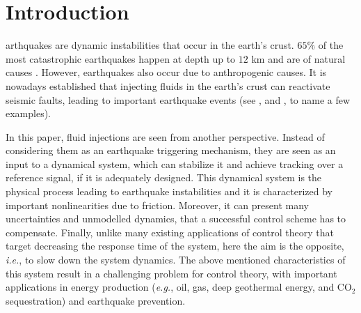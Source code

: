 \documentclass[journal,twoside,web]{ieeecolor}
\begin{document}
\section{Introduction}
\label{sec:Introduction}


arthquakes are dynamic instabilities that occur in the earth's crust. $65\%$ of the most catastrophic earthquakes happen at depth up to $12$ km and are of natural causes \cite{b:Scholz-2002}. However, earthquakes also occur due to anthropogenic causes. It is nowadays established that injecting fluids in the earth's crust can reactivate seismic faults, leading to important earthquake events (see \cite{b:Rubinstein-Mahani-2015}, \cite{b:Keranen-Savage-Abers-Cochran-2013} and \cite{b:Zastrow-2019}, to name a few examples).

In this paper, fluid injections are seen from another perspective. Instead of considering them as an earthquake triggering mechanism, they are seen as an input to a dynamical system, which can stabilize it and achieve tracking over a reference signal, if it is adequately designed. This dynamical system is the physical process leading to earthquake instabilities and it is characterized by important nonlinearities due to friction. Moreover, it can present many uncertainties and unmodelled dynamics, that a successful control scheme has to compensate. Finally, unlike many existing applications of control theory that target decreasing the response time of the system, here the aim is the opposite, \textit{i.e.}, to slow down the system dynamics. The above mentioned characteristics of this system result in a challenging problem for control theory, with important applications in energy production (\textit{e.g.}, oil, gas, deep geothermal energy, and CO$_2$ sequestration) and earthquake prevention.
\end{document}
